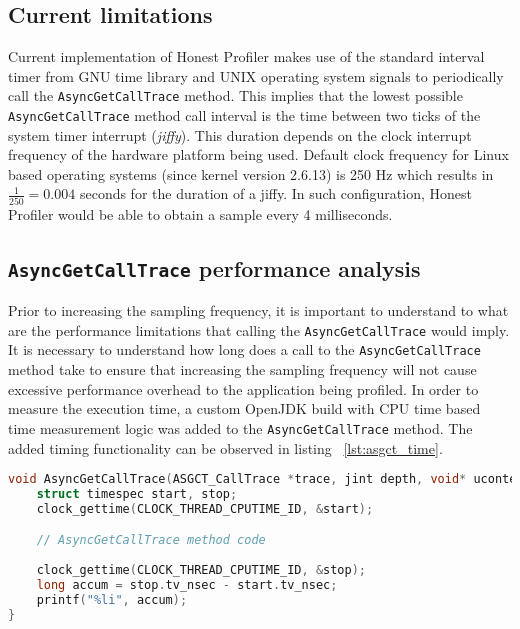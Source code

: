 \documentclass[..thesis.tex]{subfiles}
\begin{document}
\subsection{Current limitations}
Current implementation of Honest Profiler makes use of the standard interval timer from GNU time library and UNIX operating system signals to periodically call the \texttt{AsyncGetCallTrace} method. This implies that the lowest possible \texttt{Async\-Get\-Call\-Trace} method call interval is the time between two ticks of the system timer interrupt (\textit{jiffy}). This duration depends on the clock interrupt frequency of the hardware platform being used. Default clock frequency for Linux based operating systems (since kernel version 2.6.13) is 250 Hz which results in $\frac{1}{250} = 0.004$ seconds for the duration of a jiffy. \cite{linux_time} In such configuration, Honest Profiler would be able to obtain a sample every 4 milliseconds.


\subsection{\texttt{AsyncGetCallTrace} performance analysis}
Prior to increasing the sampling frequency, it is important to understand to what are the performance limitations that calling the \texttt{Async\-Get\-Call\-Trace} would imply. It is necessary to understand how long does a call to the \texttt{Async\-Get\-Call\-Trace} method take  to ensure that increasing the sampling frequency will not cause excessive performance overhead to the application being profiled. In order to measure the execution time, a custom OpenJDK build with CPU time based time measurement logic was added to the \texttt{Async\-Get\-Call\-Trace} method. The added timing functionality can be observed in listing ~\ref{lst:asgct_time}.

\begin{lstlisting}[language=C++,style=def,label={lst:asgct_time}, caption={CPU time based measurement in \texttt{AsyncGetCallTrace} method}]
void AsyncGetCallTrace(ASGCT_CallTrace *trace, jint depth, void* ucontext) {
    struct timespec start, stop;
    clock_gettime(CLOCK_THREAD_CPUTIME_ID, &start);

    // AsyncGetCallTrace method code
    
    clock_gettime(CLOCK_THREAD_CPUTIME_ID, &stop);
    long accum = stop.tv_nsec - start.tv_nsec;
    printf("%li", accum);
}
\end{lstlisting}
\end{document}
